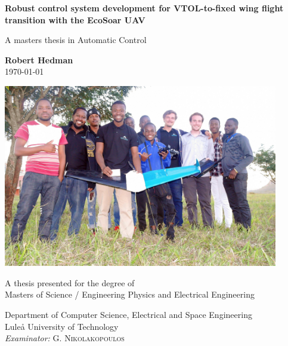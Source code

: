 \documentclass{article}
\begin{document}
\begin{titlepage}
    \begin{center}
 
        \huge
        \textbf{Robust control system development for VTOL-to-fixed wing flight transition with the EcoSoar UAV}
 
        \vspace{0.5cm}
        \LARGE
        A masters thesis in Automatic Control
 
        \vspace{1.5cm}
 
        \textbf{Robert Hedman\\}
        \today
        \vspace{0.6cm}

        \includegraphics[width=0.9\textwidth]{coverphoto.jpeg}
 
        \vfill
 
        A thesis presented for the degree of\\
        Masters of Science / Engineering Physics and Electrical Engineering
 
        \vspace{0.6cm}
 
        \Large
        Department of Computer Science, Electrical and Space Engineering\\
        Luleå University of Technology\\
        \textit{Examinator:} G. \textsc{Nikolakopoulos}

 
    \end{center}
\end{titlepage}
\end{document}
